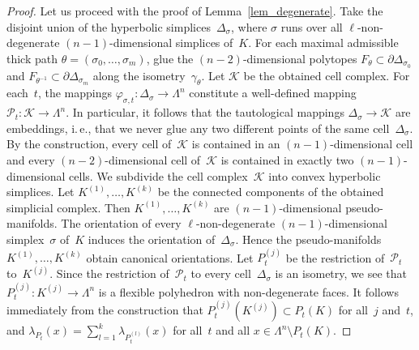 \documentclass[reqno,tbtags,12pt]{amsart}
\numberwithin{equation}{section}
\newcommand{\bell}{\boldsymbol{\ell}}
\theoremstyle{definition}
\begin{document}
\begin{proof}
Let us proceed with the proof of Lemma~\ref{lem_degenerate}. Take the disjoint union of the hyperbolic simplices~$ \Delta_{\sigma}$, where $\sigma$ runs over all $\bell$-non-degenerate $(n-1)$-dimensional simplices of~$K$. For each maximal admissible thick path $\theta=(\sigma_0,\ldots,\sigma_m)$, glue the $(n-2)$-dimensional polytopes $F_{\theta}\subset \partial  \Delta_{\sigma_0}$ and $F_{\theta^{-1}}\subset \partial  \Delta_{\sigma_m}$ along the isometry~$\gamma_{\theta}$. Let $\mathcal{K}$ be the obtained cell complex. For each~$t$, the mappings $\varphi_{\sigma,t}\colon  \Delta_{\sigma}\to\Lambda^n$ constitute a well-defined mapping $\mathcal{P}_t\colon\mathcal{K}\to \Lambda^n$. In particular, it follows that the tautological mappings $ \Delta_{\sigma}\to\mathcal{K}$ are embeddings, i.\,e., that we never glue any two different points of the same cell~$ \Delta_{\sigma}$. By the construction, every cell of~$\mathcal{K}$ is contained in an $(n-1)$-dimensional cell and every $(n-2)$-dimensional cell of~$\mathcal{K}$ is contained in exactly two $(n-1)$-dimensional cells. We subdivide the cell complex~$\mathcal{K}$ into convex hyperbolic simplices. Let $K^{(1)},\ldots,K^{(k)}$ be the connected components of the obtained simplicial complex. Then  $K^{(1)},\ldots,K^{(k)}$ are $(n-1)$-dimensional pseudo-manifolds. The orientation of every $\bell$-non-degenerate $(n-1)$-dimensional simplex~$\sigma$ of~$K$ induces the orientation of~$ \Delta_{\sigma}$. Hence the pseudo-manifolds $K^{(1)},\ldots,K^{(k)}$ obtain canonical orientations. Let $P^{(j)}_t$ be the restriction of~$\mathcal{P}_t$ to~$K^{(j)}$. Since the restriction of~$\mathcal{P}_t$ to every cell~$ \Delta_{\sigma}$ is an isometry, we see that $P^{(j)}_t\colon K^{(j)}\to\Lambda^n$ is a flexible polyhedron with non-degenerate faces.  It follows immediately from the construction that $P^{(j)}_t(K^{(j)})\subset P_t(K)$ for all~$j$ and~$t$, and $\lambda_{P_t}(x)=\sum_{l=1}^k\lambda_{P_t^{(l)}}(x)$ for all~$t$ and all $x\in \Lambda^n\setminus P_t(K)$.
\end{proof}
\end{document}
